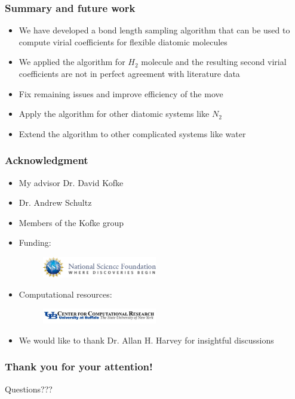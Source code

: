 \documentclass[xcolor=svgnames]{beamer}
\begin{document}
	\begin{frame}
	\frametitle{Summary and future work}
	\begin{itemize}
	\justifying
	\item We have developed a bond length sampling algorithm that can be used to compute virial coefficients for flexible diatomic molecules
	\item We applied the algorithm for $H_2$ molecule and the resulting second virial coefficients are not in perfect agreement with literature data
	\item Fix remaining issues and improve efficiency of the move
	\item Apply the algorithm for other diatomic systems like $N_2$
	\item Extend the algorithm to other complicated systems like water
	\end{itemize}
	\end{frame}
	
	\begin{frame}
	\setbeamertemplate{headline}{}
	\frametitle{Acknowledgment}
	\begin{itemize}
	\item My advisor Dr. David Kofke
	\item Dr. Andrew Schultz
	\item Members of the Kofke group
	\item Funding:
	\begin{figure}
	\centering
	\includegraphics[width=5cm,keepaspectratio]{nsfLogo.png}
	\end{figure}
	\item Computational resources:
	\begin{figure}
	\includegraphics[width=5cm,keepaspectratio]{ccrLogo.jpg}
	\end{figure}
	\item We would like to thank Dr. Allan H. Harvey for insightful discussions
	\end {itemize}
	\end{frame}

	\begin{frame}
	\frametitle{Thank you for your attention!}
	\begin{center}
	\huge{Questions???}
	\end{center}
	\end{frame}
\end{document}
